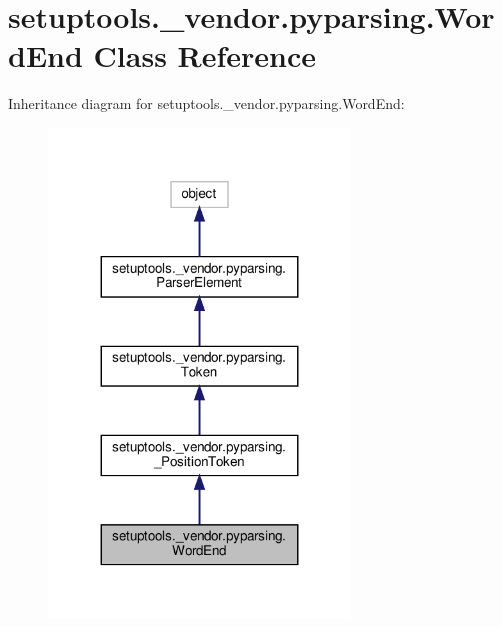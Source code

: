 \hypertarget{classsetuptools_1_1__vendor_1_1pyparsing_1_1WordEnd}{}\section{setuptools.\+\_\+vendor.\+pyparsing.\+Word\+End Class Reference}
\label{classsetuptools_1_1__vendor_1_1pyparsing_1_1WordEnd}


Inheritance diagram for setuptools.\+\_\+vendor.\+pyparsing.\+Word\+End\+:
\nopagebreak
\begin{figure}[H]
\begin{center}
\leavevmode
\includegraphics[width=227pt]{classsetuptools_1_1__vendor_1_1pyparsing_1_1WordEnd__inherit__graph}
\end{center}
\end{figure}


